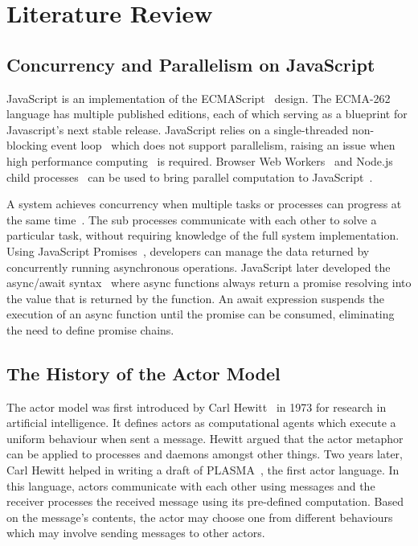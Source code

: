 \documentclass[lettersize,journal]{IEEEtran}
\begin{document}
\section{Literature Review}
\subsection{Concurrency and Parallelism on JavaScript}
JavaScript is an implementation of the ECMAScript~\cite{ecmascript} design. The ECMA-262 language has multiple published editions, each of which serving as a blueprint for Javascript's next stable release. JavaScript relies on a single-threaded non-blocking event loop~\cite{eventloopbrowser, eventloopnode} which does not support parallelism, raising an issue when high performance computing~\cite{highperformance} is required. Browser Web Workers~\cite{webworkers} and Node.js child processes~\cite{nodejs, cluster} can be used to bring parallel computation to JavaScript~\cite{concurrencyjs, spidersjs}. 

A system achieves concurrency when multiple tasks or processes can progress at the same time~\cite{concurrency}. The sub processes communicate with each other to solve a particular task, without requiring knowledge of the full system implementation. Using JavaScript Promises~\cite{promises}, developers can manage the data returned by concurrently running asynchronous operations. JavaScript later developed the async/await syntax~\cite{async} where async functions always return a promise resolving into the value that is returned by the function. An await expression suspends the execution of an async function until the promise can be consumed, eliminating the need to define promise chains.

\subsection{The History of the Actor Model}
The actor model was first introduced by Carl Hewitt~\cite{hewitt1973session, 43years} in 1973 for research in artificial intelligence. It defines actors as computational agents which execute a uniform behaviour when sent a message. Hewitt argued that the actor metaphor can be applied to processes and daemons amongst other things. Two years later, Carl Hewitt helped in writing a draft of PLASMA~\cite{plasma, chewitthowto}, the first actor language. In this language, actors communicate with each other using messages and the receiver processes the received message using its pre-defined computation. Based on the message's contents, the actor may choose one from different behaviours which may involve sending messages to other actors.
\end{document}
